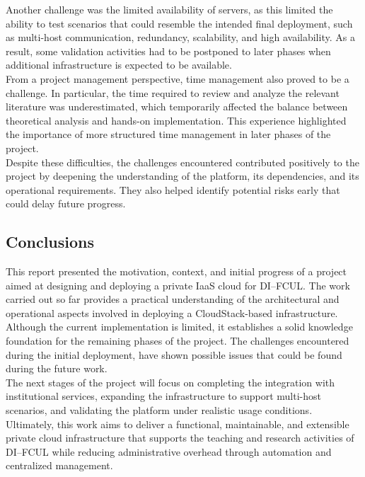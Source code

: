 \documentclass[sigplan]{acmart}
\begin{document}
        Another challenge was the limited availability of servers, as this limited the ability to test scenarios that could resemble the intended final deployment, such as multi-host communication, redundancy, scalability, and high availability. As a result, some validation activities had to be postponed to later phases when additional infrastructure is expected to be available.\\
        
        From a project management perspective, time management also proved to be a challenge. In particular, the time required to review and analyze the relevant literature was underestimated, which temporarily affected the balance between theoretical analysis and hands-on implementation. This experience highlighted the importance of more structured time management in later phases of the project.\\
        
        Despite these difficulties, the challenges encountered contributed positively to the project by deepening the understanding of the platform, its dependencies, and its operational requirements. They also helped identify potential risks early that could delay future progress.

    
    \subsection{Conclusions}
        This report presented the motivation, context, and initial progress of a project aimed at designing and deploying a private IaaS cloud for DI–FCUL. The work carried out so far provides a practical understanding of the architectural and operational aspects involved in deploying a CloudStack-based infrastructure.\\
        
        Although the current implementation is limited, it establishes a solid knowledge foundation for the remaining phases of the project. The challenges encountered during the initial deployment, have shown possible issues that could be found during the future work.\\
        
        The next stages of the project will focus on completing the integration with institutional services, expanding the infrastructure to support multi-host scenarios, and validating the platform under realistic usage conditions. Ultimately, this work aims to deliver a functional, maintainable, and extensible private cloud infrastructure that supports the teaching and research activities of DI–FCUL while reducing administrative overhead through automation and centralized management.
\end{document}
